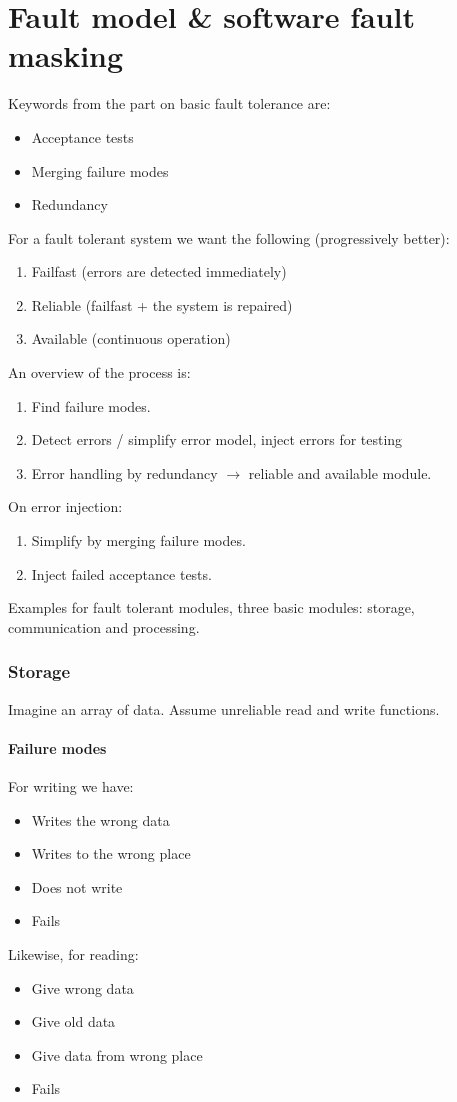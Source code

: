 \part{Fault model \& software fault masking}
Keywords from the part on basic fault tolerance are:
\begin{itemize}
    \item Acceptance tests
    \item Merging failure modes
    \item Redundancy
\end{itemize}
For a fault tolerant system we want the following (progressively better):
\begin{enumerate}
    \item Failfast (errors are detected immediately)
    \item Reliable (failfast + the system is repaired)
    \item Available (continuous operation)
\end{enumerate}
An overview of the process is:
\begin{enumerate}
    \item Find failure modes.
    \item Detect errors / simplify error model, inject errors for testing
    \item Error handling by redundancy $\rightarrow$ reliable and available module.
\end{enumerate}
On error injection:
\begin{enumerate}
    \item Simplify by merging failure modes.
    \item Inject failed acceptance tests.
\end{enumerate}
Examples for fault tolerant modules, three basic modules: storage, communication and processing.
\section{Storage}
Imagine an array of data. Assume unreliable read and write functions.
\subsection{Failure modes}
For writing we have:
\begin{itemize}
    \item Writes the wrong data
    \item Writes to the wrong place
    \item Does not write
    \item Fails
\end{itemize}
Likewise, for reading:
\begin{itemize}
    \item Give wrong data
    \item Give old data
    \item Give data from wrong place
    \item Fails
\end{itemize}

